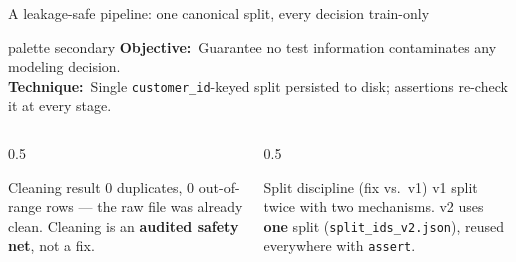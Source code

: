 \documentclass[11pt,aspectratio=169]{beamer}
\newcommand{\aimtech}[2]{%
  \begin{beamercolorbox}[wd=\textwidth,sep=5pt,rounded=true]{palette secondary}
    \footnotesize\textbf{Objective:}~#1\\[1pt]\textbf{Technique:}~#2
  \end{beamercolorbox}\vspace{3pt}%
}
\begin{document}
\begin{frame}{A leakage-safe pipeline: one canonical split, every decision train-only}
  \aimtech{Guarantee no test information contaminates any modeling decision.}%
          {Single \texttt{customer\_id}-keyed split persisted to disk; assertions re-check it at every stage.}
  \begin{center}
  \end{center}
  \begin{columns}[T]
    \begin{column}{0.5\textwidth}
      \begin{block}{\small Cleaning result}
        \footnotesize 0 duplicates, 0 out-of-range rows --- the raw file was already clean. Cleaning is an \textbf{audited safety net}, not a fix.
      \end{block}
    \end{column}
    \begin{column}{0.5\textwidth}
      \begin{exampleblock}{\small Split discipline (fix vs.\ v1)}
        \footnotesize v1 split twice with two mechanisms. v2 uses \textbf{one} split (\texttt{split\_ids\_v2.json}), reused everywhere with \texttt{assert}.
      \end{exampleblock}
    \end{column}
  \end{columns}
\end{frame}
\end{document}
